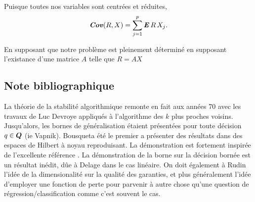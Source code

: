 Puisque toutes nos variables sont centrées et réduites,
\begin{equation}
  \operatorname{\mbox{\textbf{\textit{Cov}}}}(R,X) = \sum_{j=1}^p\operatorname{\mbox{\textbf{\textit{E}}}} R\,X_j.
\end{equation}

En supposant que notre problème est pleinement déterminé en supposant l'existance d'une
matrice $A$ telle que $R = AX$


\subsection{Note bibliographique}

La théorie de la stabilité algorithmique remonte en fait aux années 70 avec les travaux de
Luc Devroye appliqués à l'algorithme des $k$ plus proches voisins\cit. Jusqu'alors, les
bornes de généralisation étaient présentées pour toute décision $q \in \bm Q$ (ie
Vapnik). Bousquet\cit a été le premier a présenter des résultats dans des espaces de
Hilbert à noyau reproduisant. La démonstration est fortement inspirée de l'excellente
référence \cite{mohri2012foundations}. La démonstration de la borne sur la décision bornée
est un résultat inédit, dûe à Delage dans le cas linéaire. On doit également à Rudin
l'idée de la dimensionalité sur la qualité des garanties, et plus généralement l'idée
d'employer une fonction de perte pour parvenir à autre chose qu'une question de
régression/classification comme c'est souvent le cas.




